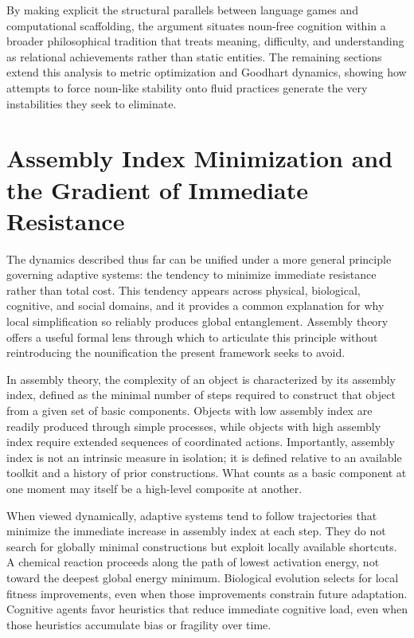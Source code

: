 \documentclass[12pt]{article}
\begin{document}
By making explicit the structural parallels between language games and computational scaffolding, the argument situates noun-free cognition within a broader philosophical tradition that treats meaning, difficulty, and understanding as relational achievements rather than static entities. The remaining sections extend this analysis to metric optimization and Goodhart dynamics, showing how attempts to force noun-like stability onto fluid practices generate the very instabilities they seek to eliminate.

\section{Assembly Index Minimization and the Gradient of Immediate Resistance}

The dynamics described thus far can be unified under a more general principle governing adaptive systems: the tendency to minimize immediate resistance rather than total cost. This tendency appears across physical, biological, cognitive, and social domains, and it provides a common explanation for why local simplification so reliably produces global entanglement. Assembly theory offers a useful formal lens through which to articulate this principle without reintroducing the nounification the present framework seeks to avoid.

In assembly theory, the complexity of an object is characterized by its assembly index, defined as the minimal number of steps required to construct that object from a given set of basic components. Objects with low assembly index are readily produced through simple processes, while objects with high assembly index require extended sequences of coordinated actions. Importantly, assembly index is not an intrinsic measure in isolation; it is defined relative to an available toolkit and a history of prior constructions. What counts as a basic component at one moment may itself be a high-level composite at another.

When viewed dynamically, adaptive systems tend to follow trajectories that minimize the immediate increase in assembly index at each step. They do not search for globally minimal constructions but exploit locally available shortcuts. A chemical reaction proceeds along the path of lowest activation energy, not toward the deepest global energy minimum. Biological evolution selects for local fitness improvements, even when those improvements constrain future adaptation. Cognitive agents favor heuristics that reduce immediate cognitive load, even when those heuristics accumulate bias or fragility over time.
\end{document}
